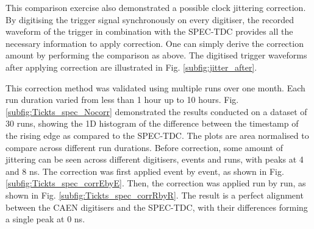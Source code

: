This comparison exercise also demonstrated a possible clock jittering correction.
By digitising the trigger signal synchronously on every digitiser, the recorded waveform of the trigger in combination with the SPEC-TDC provides all the necessary information to apply correction.
One can simply derive the correction amount by performing the comparison as above.
The digitised trigger waveforms after applying correction are illustrated in Fig. \ref{subfig:jitter_after}.


This correction method was validated using multiple runs over one month.
Each run duration varied from less than 1 hour up to 10 hours.
Fig. \ref{subfig:Tickts_spec_Nocorr} demonstrated the results conducted on a dataset of 30 runs, showing the 1D histogram of the difference between the timestamp of the rising edge as compared to the
 SPEC-TDC.
The plots are area normalised to compare across different run durations.
Before correction, some amount of jittering can be seen across different digitisers, events and runs, with peaks at 4 and 8 ns.
The correction was first applied event by event, as shown in Fig. \ref{subfig:Tickts_spec_corrEbyE}.
Then, the correction was applied run by run, as shown in Fig. \ref{subfig:Tickts_spec_corrRbyR}.
The result is a perfect alignment between the CAEN digitisers and the SPEC-TDC, with their differences forming a single peak at 0 ns.

